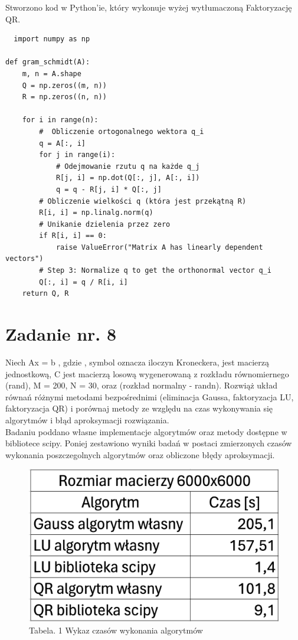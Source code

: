 \documentclass{article}
\begin{document}
Stworzono kod w Python'ie, który wykonuje wyżej wytłumaczoną Faktoryzację QR.\\

\begin{lstlisting}
  import numpy as np

def gram_schmidt(A):
    m, n = A.shape
    Q = np.zeros((m, n))
    R = np.zeros((n, n))

    for i in range(n):
        #  Obliczenie ortogonalnego wektora q_i
        q = A[:, i]
        for j in range(i):
            # Odejmowanie rzutu q na każde q_j
            R[j, i] = np.dot(Q[:, j], A[:, i])
            q = q - R[j, i] * Q[:, j]
        # Obliczenie wielkości q (która jest przekątną R)
        R[i, i] = np.linalg.norm(q)
        # Unikanie dzielenia przez zero
        if R[i, i] == 0:
            raise ValueError("Matrix A has linearly dependent vectors")
        # Step 3: Normalize q to get the orthonormal vector q_i
        Q[:, i] = q / R[i, i]
    return Q, R

\end{lstlisting}
\newpage
\section{Zadanie nr. 8}

Niech Ax = b , gdzie , symbol  oznacza iloczyn Kroneckera,
 jest macierzą jednostkową,  C jest macierzą losową wygenerowaną z rozkładu
równomiernego (rand), M = 200, N = 30, oraz   (rozkład normalny - randn).
Rozwiąż układ równań różnymi metodami bezpośrednimi (eliminacja Gaussa, faktoryzacja LU,
faktoryzacja QR) i porównaj metody ze względu na czas wykonywania się algorytmów i błąd
aproksymacji rozwiązania.\\

Badaniu poddano własne implementacje algorytmów oraz metody dostępne w bibliotece scipy.
Poniej zestawiono wyniki badań w postaci zmierzonych czasów wykonania poszczegolnych algorytmów oraz obliczone błędy aproksymacji.
\begin{figure}[h]
  \includegraphics[scale=0.3]{image.png}
  \centering
  \captionsetup[Tabela]{name=New Table Name}
  \caption*{Tabela. 1 Wykaz czasów wykonania algorytmów}
  \end{figure}
\end{document}
